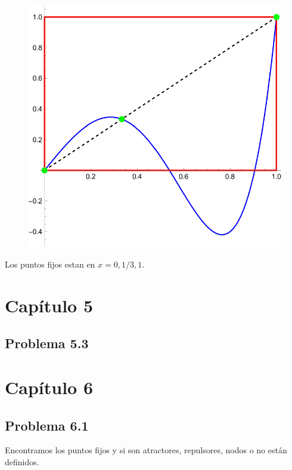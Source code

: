 \documentclass[conference]{IEEEtran}
\begin{document}
\begin{figure}[H]
	\centering
	\includegraphics[scale=0.4]{./img/p4-10}
\end{figure}

Los puntos fijos estan en $x = 0,1/3,1$.





\section{Capítulo 5}

\subsection{Problema 5.3}









\section{Capítulo 6}

\subsection{Problema 6.1}
Encontramos los puntos fijos y si son atractores, repulsores, nodos o no están definidos.
\end{document}
